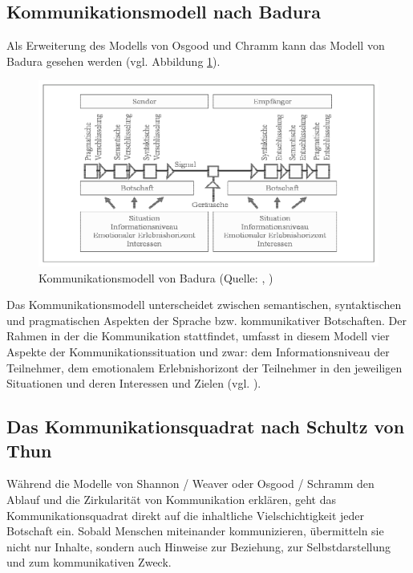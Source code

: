\subsection{Kommunikationsmodell nach Badura}
Als Erweiterung des Modells von Osgood und Chramm kann das Modell von Badura gesehen werden (vgl. Abbildung \ref{fig:badura-modell}).

\begin{figure}[ht]
\centering
\includegraphics[width=1\linewidth]{content/pictures/badura.PNG}
\caption{Kommunikationsmodell von Badura (Quelle: \cite{badura_kommunikation_1992}, \cite[S. 93]{scheufele_kommunikation_2007})}
\label{fig:badura-modell}
\end{figure}

Das Kommunikationsmodell unterscheidet zwischen semantischen, syntaktischen und pragmatischen Aspekten der Sprache bzw. kommunikativer Botschaften. Der Rahmen in der die Kommunikation stattfindet, umfasst in diesem Modell vier Aspekte der Kommunikationssituation und zwar: dem Informationsniveau der Teilnehmer, dem emotionalem Erlebnishorizont der Teilnehmer in den jeweiligen Situationen und deren Interessen und Zielen (vgl. \cite[S. 93]{scheufele_kommunikation_2007}).

\subsection{Das Kommunikationsquadrat nach Schultz von Thun}
Während die Modelle von Shannon / Weaver oder Osgood / Schramm den Ablauf und die Zirkularität von Kommunikation erklären, geht das Kommunikationsquadrat direkt auf die inhaltliche Vielschichtigkeit jeder Botschaft ein. Sobald Menschen miteinander kommunizieren, übermitteln sie nicht nur Inhalte, sondern auch Hinweise zur Beziehung, zur Selbstdarstellung und zum kommunikativen Zweck.

